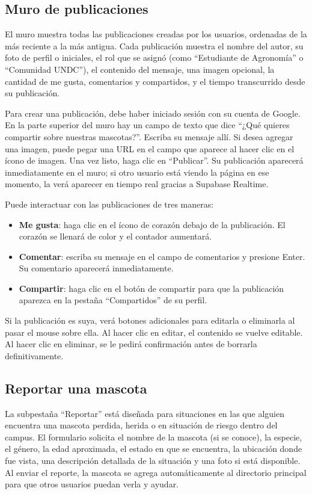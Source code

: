 \documentclass[12pt,a4paper]{article}
\begin{document}
\subsection{Muro de publicaciones}

El muro muestra todas las publicaciones creadas por los usuarios, ordenadas de la más reciente a la más antigua. Cada publicación muestra el nombre del autor, su foto de perfil o iniciales, el rol que se asignó (como ``Estudiante de Agronomía'' o ``Comunidad UNDC''), el contenido del mensaje, una imagen opcional, la cantidad de me gusta, comentarios y compartidos, y el tiempo transcurrido desde su publicación.

Para crear una publicación, debe haber iniciado sesión con su cuenta de Google. En la parte superior del muro hay un campo de texto que dice ``¿Qué quieres compartir sobre nuestras mascotas?''. Escriba su mensaje allí. Si desea agregar una imagen, puede pegar una URL en el campo que aparece al hacer clic en el ícono de imagen. Una vez listo, haga clic en ``Publicar''. Su publicación aparecerá inmediatamente en el muro; si otro usuario está viendo la página en ese momento, la verá aparecer en tiempo real gracias a Supabase Realtime.

Puede interactuar con las publicaciones de tres maneras:

\begin{itemize}
    \item \textbf{Me gusta}: haga clic en el ícono de corazón debajo de la publicación. El corazón se llenará de color y el contador aumentará.
    \item \textbf{Comentar}: escriba su mensaje en el campo de comentarios y presione Enter. Su comentario aparecerá inmediatamente.
    \item \textbf{Compartir}: haga clic en el botón de compartir para que la publicación aparezca en la pestaña ``Compartidos'' de su perfil.
\end{itemize}

Si la publicación es suya, verá botones adicionales para editarla o eliminarla al pasar el mouse sobre ella. Al hacer clic en editar, el contenido se vuelve editable. Al hacer clic en eliminar, se le pedirá confirmación antes de borrarla definitivamente.

\subsection{Reportar una mascota}

La subpestaña ``Reportar'' está diseñada para situaciones en las que alguien encuentra una mascota perdida, herida o en situación de riesgo dentro del campus. El formulario solicita el nombre de la mascota (si se conoce), la especie, el género, la edad aproximada, el estado en que se encuentra, la ubicación donde fue vista, una descripción detallada de la situación y una foto si está disponible. Al enviar el reporte, la mascota se agrega automáticamente al directorio principal para que otros usuarios puedan verla y ayudar.
\end{document}
